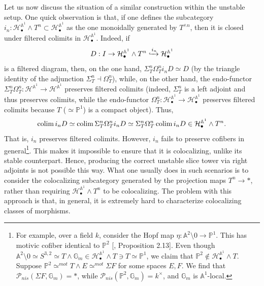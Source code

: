 Let us now discuss the situation of a similar construction within the unstable setup. One quick observation is that, if one defines the subcategory $i_n:\mathcal{H}^{\mathbb{A}^1}_\bullet\wedge T^n\subset \mathcal{H}^{\mathbb{A}^1}_\bullet$ as the one monoidally generated by $T^{\wedge n}$, then it is closed under filtered colimits in $\mathcal{H}_\bullet^{\mathbb{A}^1}$. Indeed, if $$D:I\to \mathcal{H}^{\mathbb{A}^1}_\bullet \wedge T^n\xhookrightarrow{i_n}\mathcal{H}^{\mathbb{A}^1}_\bullet$$ is a filtered diagram, then, on the one hand, $\Sigma_T^n\Omega^n_Ti_nD\simeq D$ (by the triangle identity of the adjunction $\Sigma_T^n\dashv \Omega^n_T$), while, on the other hand, the endo-functor $\Sigma_T^n\Omega_T^n:\mathcal{H}^{\mathbb{A}^1}\to \mathcal{H}^{\mathbb{A}^1}$ preserves filtered colimits (indeed, $\Sigma_T^n$ is a left adjoint and thus preserves colimits, while the endo-functor $\Omega_T^n:\mathcal{H}^{\mathbb{A}^1}_\bullet\to \mathcal{H}^{\mathbb{A}^1}_\bullet$ preserves filtered colimits because $T$ ($\simeq \mathbb{P}^1$) is a compact object). Thus, $$\mathop{\mathrm{colim}}\limits{i_nD}\simeq \mathop{\mathrm{colim}}\limits\Sigma_T^n\Omega_T^n{i_nD}\simeq \Sigma_T^n\Omega_T^n\mathop{\mathrm{colim}}\limits{i_nD}\in \mathcal{H}^{\mathbb{A}^1}_\bullet \wedge T^n.$$ That is, $i_n$ preserves filtered colimits. However, $i_n$ fails to preserve cofibers in general\footnote{For example, over a field $k$, consider the Hopf map $\eta : \mathbb{A}^2\setminus 0\to \mathbb{P}^1$. This has motivic cofiber identical to $\mathbb{P}^2$ [\cite{dugger2005motivic}, Proposition 2.13]. Even though $\mathbb{A}^2\setminus 0\simeq S^{3,2}\simeq T\wedge\mathbb{G}_m\in \mathcal{H}^{\mathbb{A}^1}_\bullet\wedge T\ni T\simeq \mathbb{P}^1$, we claim that $\mathbb{P}^2\notin \mathcal{H}^{\mathbb{A}^1}_\bullet\wedge T$. Suppose $\mathbb{P}^2\simeq^{mot} T\wedge E\simeq^{mot} \Sigma F$ for some spaces $E,F$. We find that $\mathcal{P}_{nis}(\Sigma F, \mathbb{G}_m)=*$, while $\mathcal{P}_{nis}(\mathbb{P}^2, \mathbb{G}_m)=k^\times$, and $\mathbb{G}_m$ is $\mathbb{A}^1$-local.}. This makes it impossible to ensure that it is colocalizing, unlike its stable counterpart. Hence, producing the correct unstable slice tower via right adjoints is not possible this way. What one usually does in such scenarios is to consider the colocalizing subcategory generated by the projection maps $T^n\to *$, rather than requiring $\mathcal{H}^{\mathbb{A}^1}_\bullet\wedge T^n$ to be colocalizing. The problem with this approach is that, in general, it is extremely hard to characterize colocalizing classes of morphisms. 

